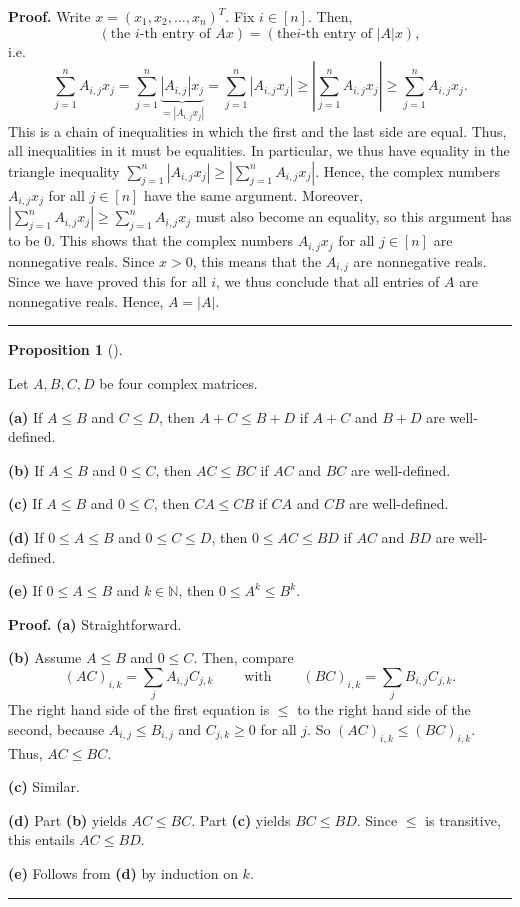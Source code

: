 \documentclass[numbers=enddot,12pt,final,onecolumn,notitlepage]{scrartcl}%
\numberwithin{exer}{subsection}
\theoremstyle{definition}
\newtheorem{prop}[theo]{Proposition}
\newenvironment{proposition}[1][]
{\begin{prop}[#1]\begin{leftbar}}
{\end{leftbar}\end{prop}}
\newenvironment{proof}[1][Proof]{\noindent\textbf{#1.} }{\ \rule{0.5em}{0.5em}}
\let\sumnonlimits\sum
\renewcommand{\sum}{\sumnonlimits\limits}
\begin{document}
\begin{proof}
Write $x=\left(  x_{1},x_{2},\ldots,x_{n}\right)  ^{T}$. Fix $i\in\left[
n\right]  $. Then,%
\[
\left(  \text{the }i\text{-th entry of }Ax\right)  =\left(  \text{the
}i\text{-th entry of }\left\vert A\right\vert x\right)  ,
\]
i.e.%
\[
\sum_{j=1}^{n}A_{i,j}x_{j}=\sum_{j=1}^{n}\underbrace{\left\vert A_{i,j}%
\right\vert x_{j}}_{=\left\vert A_{i,j}x_{j}\right\vert }=\sum_{j=1}%
^{n}\left\vert A_{i,j}x_{j}\right\vert \geq\left\vert \sum_{j=1}^{n}%
A_{i,j}x_{j}\right\vert \geq\sum_{j=1}^{n}A_{i,j}x_{j}.
\]
This is a chain of inequalities in which the first and the last side are
equal. Thus, all inequalities in it must be equalities. In particular, we thus
have equality in the triangle inequality $\sum_{j=1}^{n}\left\vert
A_{i,j}x_{j}\right\vert \geq\left\vert \sum_{j=1}^{n}A_{i,j}x_{j}\right\vert
$. Hence, the complex numbers $A_{i,j}x_{j}$ for all $j\in\left[  n\right]  $
have the same argument. Moreover, $\left\vert \sum_{j=1}^{n}A_{i,j}%
x_{j}\right\vert \geq\sum_{j=1}^{n}A_{i,j}x_{j}$ must also become an equality,
so this argument has to be $0$. This shows that the complex numbers
$A_{i,j}x_{j}$ for all $j\in\left[  n\right]  $ are nonnegative reals. Since
$x>0$, this means that the $A_{i,j}$ are nonnegative reals. Since we have
proved this for all $i$, we thus conclude that all entries of $A$ are
nonnegative reals. Hence, $A=\left\vert A\right\vert $.
\end{proof}

\begin{proposition}
Let $A,B,C,D$ be four complex matrices.

\textbf{(a)} If $A\leq B$ and $C\leq D$, then $A+C\leq B+D$ if $A+C$ and $B+D$
are well-defined.

\textbf{(b)} If $A\leq B$ and $0\leq C$, then $AC\leq BC$ if $AC$ and $BC$ are well-defined.

\textbf{(c)} If $A\leq B$ and $0\leq C$, then $CA\leq CB$ if $CA$ and $CB$ are well-defined.

\textbf{(d)} If $0\leq A\leq B$ and $0\leq C\leq D$, then $0\leq AC\leq BD$ if
$AC$ and $BD$ are well-defined.

\textbf{(e)} If $0\leq A\leq B$ and $k\in\mathbb{N}$, then $0\leq A^{k}\leq
B^{k}$.
\end{proposition}

\begin{proof}
\textbf{(a)} Straightforward.

\textbf{(b)} Assume $A\leq B$ and $0\leq C$. Then, compare
\[
\left(  AC\right)  _{i,k}=\sum_{j}A_{i,j}C_{j,k}%
\ \ \ \ \ \ \ \ \ \ \text{with}\ \ \ \ \ \ \ \ \ \ \left(  BC\right)
_{i,k}=\sum_{j}B_{i,j}C_{j,k}.
\]
The right hand side of the first equation is $\leq$ to the right hand side of
the second, because $A_{i,j}\leq B_{i,j}$ and $C_{j,k}\geq0$ for all $j$. So
$\left(  AC\right)  _{i,k}\leq\left(  BC\right)  _{i,k}$. Thus, $AC\leq BC$.

\textbf{(c)} Similar.

\textbf{(d)} Part \textbf{(b)} yields $AC\leq BC$. Part \textbf{(c)} yields
$BC\leq BD$. Since $\leq$ is transitive, this entails $AC\leq BD$.

\textbf{(e)} Follows from \textbf{(d)} by induction on $k$.
\end{proof}
\end{document}
